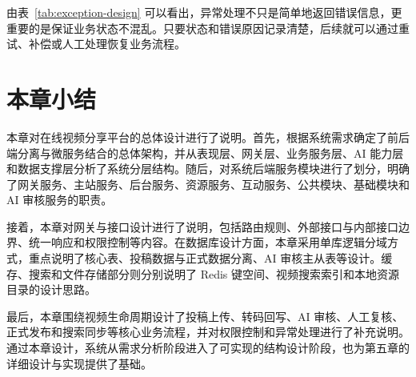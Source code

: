 由表~\ref{tab:exception-design} 可以看出，异常处理不只是简单地返回错误信息，更重要的是保证业务状态不混乱。只要状态和错误原因记录清楚，后续就可以通过重试、补偿或人工处理恢复业务流程。

\section{本章小结}
\label{sec:chapter4-summary}

本章对在线视频分享平台的总体设计进行了说明。首先，根据系统需求确定了前后端分离与微服务结合的总体架构，并从表现层、网关层、业务服务层、AI 能力层和数据支撑层分析了系统分层结构。随后，对系统后端服务模块进行了划分，明确了网关服务、主站服务、后台服务、资源服务、互动服务、公共模块、基础模块和 AI 审核服务的职责。

接着，本章对网关与接口设计进行了说明，包括路由规则、外部接口与内部接口边界、统一响应和权限控制等内容。在数据库设计方面，本章采用单库逻辑分域方式，重点说明了核心表、投稿数据与正式数据分离、AI 审核主从表等设计。缓存、搜索和文件存储部分则分别说明了 Redis 键空间、视频搜索索引和本地资源目录的设计思路。

最后，本章围绕视频生命周期设计了投稿上传、转码回写、AI 审核、人工复核、正式发布和搜索同步等核心业务流程，并对权限控制和异常处理进行了补充说明。通过本章设计，系统从需求分析阶段进入了可实现的结构设计阶段，也为第五章的详细设计与实现提供了基础。
